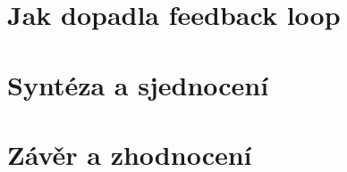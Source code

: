 \documentclass[11pt,a4paper]{article}
\begin{document}
\section{Jak dopadla feedback loop}





\section{Syntéza a sjednocení}





\section{Závěr a zhodnocení}


\newpage

\printbibliography[heading=bibintoc, title={Bibliografie}]
\end{document}
